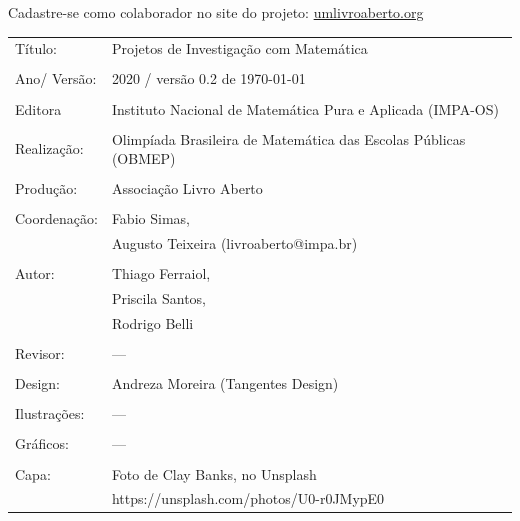 \vspace*{.3cm}

Cadastre-se como colaborador no site do projeto: \url{umlivroaberto.org}



\begin{tabular}{p{}p{}}
Título: & Projetos de Investigação com Matemática\\
\\
Ano/ Versão: & 2020 / versão 0.2 de \today\\
\\
Editora & Instituto Nacional de Matem\'atica Pura e Aplicada (IMPA-OS)\\
\\
Realização:& Olimp\'iada Brasileira de Matem\'atica das Escolas P\'ublicas (OBMEP)\\
\\
Produção:& Associação Livro Aberto\\
\\
Coordenação: & Fabio Simas, \\
			&  Augusto Teixeira (livroaberto@impa.br)\\
\\
  Autor: & Thiago Ferraiol, \\
         & Priscila Santos, \\
         & Rodrigo Belli \\
\\
Revisor: &  ---  \\
\\
Design: & Andreza Moreira (Tangentes Design) \\
\\
  Ilustrações: & --- \\ 
\\
Gráficos: & --- \\
\\
  Capa: & Foto de Clay Banks, no Unsplash \\
  		& https://unsplash.com/photos/U0-r0JMypE0 \\

\end{tabular}


